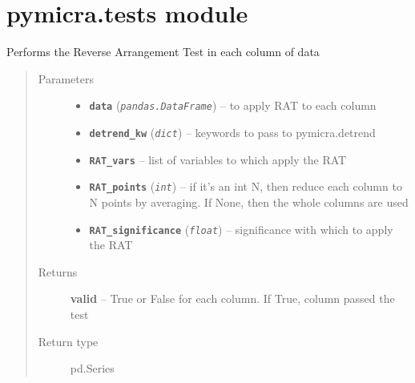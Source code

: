 \documentclass[a4paper,10pt,oneside]{sphinxmanual}
\begin{document}
\section{pymicra.tests module}
\label{pymicra:pymicra-tests-module}\label{pymicra:module-pymicra.tests}

\begin{fulllineitems}
\label{pymicra:pymicra.tests.check_RA}
Performs the Reverse Arrangement Test in each column of data
\begin{quote}\begin{description}
\item[{Parameters}] \leavevmode\begin{itemize}
\item {} 
\textbf{\texttt{data}} (\emph{\texttt{pandas.DataFrame}}) -- to apply RAT to each column

\item {} 
\textbf{\texttt{detrend\_kw}} (\emph{\texttt{dict}}) -- keywords to pass to pymicra.detrend

\item {} 
\textbf{\texttt{RAT\_vars}} -- list of variables to which apply the RAT

\item {} 
\textbf{\texttt{RAT\_points}} (\emph{\texttt{int}}) -- if it's an int N, then reduce each column to N points by averaging. If None,
then the whole columns are used

\item {} 
\textbf{\texttt{RAT\_significance}} (\emph{\texttt{float}}) -- significance with which to apply the RAT

\end{itemize}

\item[{Returns}] \leavevmode
\textbf{valid} -- True or False for each column. If True, column passed the test

\item[{Return type}] \leavevmode
pd.Series

\end{description}\end{quote}

\end{fulllineitems}
\end{document}
